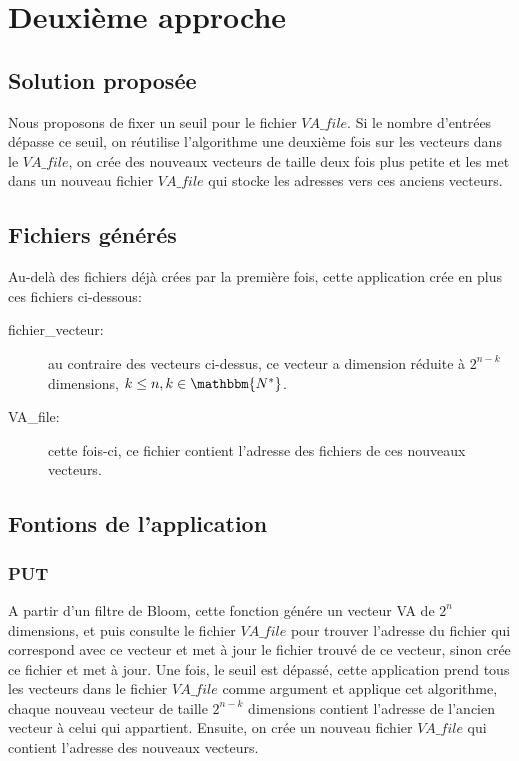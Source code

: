 \documentclass[a4paper,12pt]{report}
\begin{document}
\chapter{Deuxième approche}
\section{Solution proposée}
	Nous proposons de fixer un seuil pour le fichier $VA\_file$. Si le nombre d'entrées dépasse ce seuil, on réutilise l'algorithme une deuxième fois sur les vecteurs dans le $VA\_file$, on crée des nouveaux vecteurs de taille deux fois plus petite et les met dans un nouveau fichier $VA\_file$ qui stocke les adresses vers ces anciens vecteurs.
	
\section{Fichiers générés}
	Au-delà des fichiers déjà crées par la première fois, cette application crée en plus ces fichiers ci-dessous:
	\begin{description}
		\item[fichier\_vecteur:] au contraire des vecteurs ci-dessus, ce vecteur a dimension réduite à $2^{n-k}$ dimensions, $k \leq n, k \in \mathbbm{N^*}$.
		\item[VA\_file: ] cette fois-ci, ce fichier contient l'adresse des fichiers de ces nouveaux vecteurs.
	\end{description}
	
\section{Fontions de l'application}
\subsection{PUT}
	A partir d'un filtre de Bloom, cette fonction génére un vecteur VA de $2^n$ dimensions, et puis consulte le fichier $VA\_file$ pour trouver l'adresse du fichier qui correspond avec ce vecteur et met à jour le fichier trouvé de ce vecteur, sinon crée ce fichier et met à jour. Une fois, le seuil est dépassé, cette application prend tous les vecteurs dans le fichier $VA\_file$ comme argument et applique cet algorithme, chaque nouveau vecteur de taille $2^{n-k}$ dimensions contient l'adresse de l'ancien vecteur à celui qui appartient. Ensuite, on crée un nouveau fichier $VA\_file$ qui contient l'adresse des nouveaux vecteurs.
	
\end{document}
